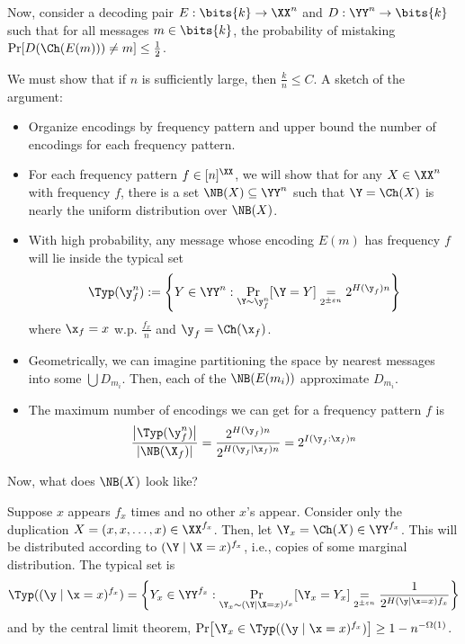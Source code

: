\documentclass[class=co432,notes,tikz]{agony}
\begin{document}
\begin{prf}
  Now, consider a decoding pair $E : \bits{k} \to \XX^n$
  and $D : \YY^n \to \bits{k}$ such that for all messages $m \in \bits{k}$,
  the probability of mistaking $\Pr[D(\Ch(E(m))) \neq m] \leq \frac12$.

  We must show that if $n$ is sufficiently large, then $\frac kn \leq C$.
  A sketch of the argument:
  \begin{itemize}
    \item Organize encodings by frequency pattern and upper bound the number
          of encodings for each frequency pattern.
    \item For each frequency pattern $f \in [n]^{\XX}$,
          we will show that for any $X \in \XX^n$ with frequency $f$,
          there is a set $\NB(X) \subseteq \YY^n$ such that $\Y = \Ch(X)$
          is nearly the uniform distribution over $\NB(X)$.
    \item With high probability, any message whose encoding $E(m)$ has frequency $f$
          will lie inside the typical set
          \[ \Typ(\y^n_f) := \qty{ Y \in \YY^n : \Pr_{\Y \sim \y^n_f}[\Y = Y] \underset{2^{\pm \varepsilon n}}{=} 2^{H(\y_f)n} } \]
          where $\x_f = x$ w.p. $\frac{f_x}{n}$ and $\y_f = \Ch(\x_f)$.
    \item Geometrically, we can imagine partitioning the space by
          nearest messages into some $\bigcup D_{m_i}$.
          Then, each of the $\NB(E(m_i))$ approximate $D_{m_i}$.
    \item The maximum number of encodings we can get for a frequency pattern $f$ is
          \[
            \frac{\abs{\Typ(\y_f^n)}}{\abs{\NB(\X_f)}}
            = \frac{2^{H(\y_f)n}}{2^{H(\y_f \mid \x_f)n}}
            = 2^{I(\y_f : \x_f)n}
          \]
  \end{itemize}
  Now, what does $\NB(X)$ look like?

  Suppose $x$ appears $f_x$ times and no other $x$'s appear.
  Consider only the duplication $X = (x,x,\dotsc,x) \in \XX^{f_x}$.
  Then, let $\Y_x = \Ch(X) \in \YY^{f_x}$.
  This will be distributed according to $(\Y \mid \X = x)^{f_x}$,
  i.e., \iid copies of some marginal distribution. The typical set is
  \[
    \Typ((\y \mid \x = x)^{f_x}) = \qty{
      Y_x \in \YY^{f_x} : \Pr_{\Y_x \sim (\Y \mid \X = x)^{f_x}}[\Y_x = Y_x] \underset{2^{\pm \varepsilon n}}{=}
      \frac{1}{2^{H(\y \mid \x=x)f_x}}
    }
  \]
  and by the central limit theorem, $\Pr[\Y_x \in \Typ((\y \mid \x=x)^{f_x})] \geq 1-n^{-\Omega(1)}$.


\end{prf}
\end{document}
